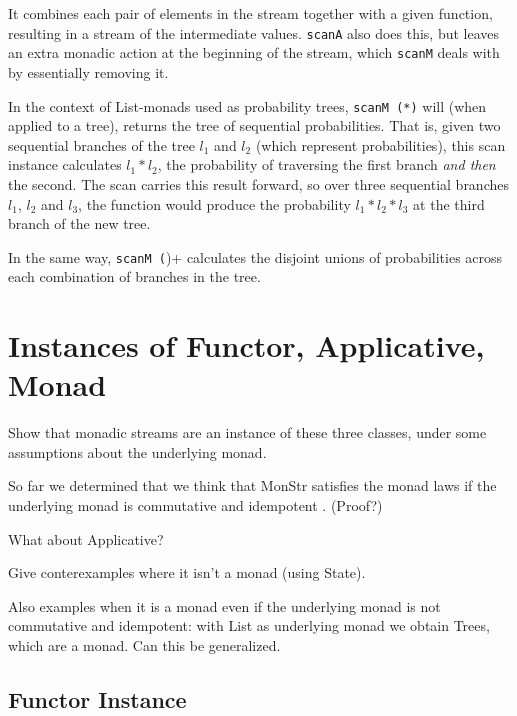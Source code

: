\documentclass{article}
\begin{document}
It combines each pair of elements in the stream together with a given function, resulting in a stream of the intermediate values. \verb+scanA+ also does this, but leaves an extra monadic action at the beginning of the stream, which \verb+scanM+ deals with by essentially removing it.

In the context of List-monads used as probability trees, \verb+scanM (*)+ will (when applied to a tree), returns the tree of sequential probabilities. That is, given two sequential branches of the tree $l_1$ and $l_2$ (which represent probabilities), this scan instance calculates $l_1 * l_2$, the probability of traversing the first branch \emph{and then} the second. The scan carries this result forward, so over three sequential branches $l_1$, $l_2$ and $l_3$, the function would produce the probability $l_1 * l_2 * l_3$ at the third branch of the new tree. 

In the same way, \verb+scanM (+)+ calculates the disjoint unions of probabilities across each combination of branches in the tree. \\





\section{Instances of Functor, Applicative, Monad}

Show that monadic streams are an instance of these three classes, under some assumptions about the underlying monad.

So far we determined that we think that MonStr satisfies the monad laws if the underlying monad is commutative and idempotent \cite{idempotent_monads}. (Proof?)

What about Applicative?

Give conterexamples where it isn't a monad (using State).

Also examples when it is a monad even if the underlying monad is not commutative and idempotent: with List as underlying monad we obtain Trees, which are a monad. Can this be generalized.

\subsection{Functor Instance}
\end{document}
